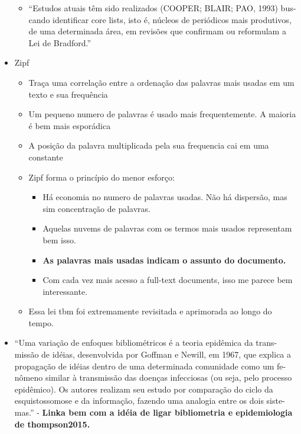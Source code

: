 \documentclass[11pt]{article}
\begin{document}
\begin{itemize}
\begin{itemize}
\begin{itemize}
\end{itemize}
\item ``Estudos atuais têm sido realizados (COOPER; BLAIR; PAO, 1993) bus- cando identificar core lists, isto é, núcleos de periódicos mais produtivos, de uma determinada área, em revisões que confirmam ou reformulam a Lei de Bradford.''
\end{itemize}
\item Zipf
\begin{itemize}
\item Traça uma correlação entre a ordenação das palavras mais usadas em um texto e sua frequência
\item Um pequeno numero de palavras é usado mais frequentemente. A maioria é bem mais esporádica
\item A posição da palavra multiplicada pela sua frequencia cai em uma constante
\item Zipf forma o princípio do menor esforço:
\begin{itemize}
\item Há economia no numero de palavras usadas. Não há dispersão, mas sim concentração de palavras.
\item Aquelas nuvems de palavras com os termos mais usados representam bem isso.
\item \textbf{As palavras mais usadas indicam o assunto do documento.}
\item Com cada vez mais acesso a full-text documents, isso me parece bem interessante.
\end{itemize}
\item Essa lei tbm foi extremamente revisitada e aprimorada ao longo do tempo.
\end{itemize}

\item ``Uma variação de enfoques bibliométricos é a teoria epidêmica da trans- missão de idéias, desenvolvida por Goffman e Newill, em 1967, que explica a propagação de idéias dentro de uma determinada comunidade como um fe- nômeno similar à transmissão das doenças infecciosas (ou seja, pelo processo epidêmico). Os autores realizam seu estudo por comparação do ciclo da esquistossomose e da informação, fazendo uma analogia entre os dois siste- mas.'' - \textbf{Linka bem com a idéia de ligar bibliometria e epidemiologia de thompson2015.}


\end{itemize}
\end{document}
